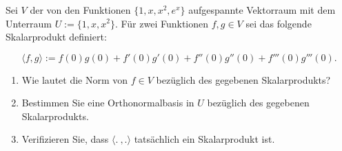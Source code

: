 \newpage

\subsubsection{} %

Sei \( V \) der von den Funktionen \( \{1,x,x^2,e^x\} \) aufgespannte Vektorraum mit dem Unterraum \( U:=\{1,x,x^2\} \). Für zwei Funktionen \( f,g \in V \) sei das folgende Skalarprodukt definiert:

\begin{equation*}
    \langle f,g \rangle := f(0)g(0)+f'(0)g'(0)+f''(0)g''(0)+f'''(0)g'''(0).
\end{equation*}

\begin{enumerate}[label=\alph*)]
    \item Wie lautet die Norm von \( f \in V \) bezüglich des gegebenen Skalarprodukts?
    \item Bestimmen Sie eine Orthonormalbasis in \( U \) bezüglich des gegebenen Skalarprodukts.
    \item Verifizieren Sie, dass \( \langle . \:,. \rangle \) tatsächlich ein Skalarprodukt ist.
\end{enumerate}

\vspace{1\baselineskip}

